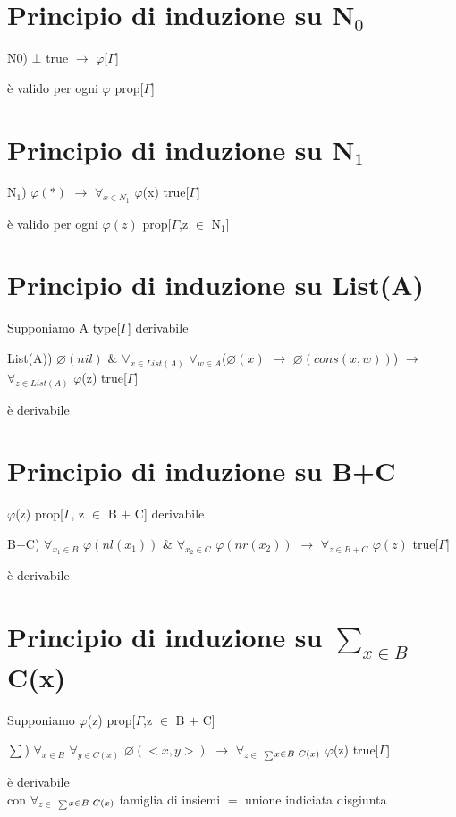 \section{Principio di induzione su N$_0$}
\label{sec:principio-di-induzione-N0}
\begin{center}N$0$) $\bot$ true $\rightarrow$ $\varphi$[$\Gamma$]\end{center} \`e valido per ogni $\varphi$ prop[$\Gamma$]
\section{Principio di induzione su N$_1$}
\label{sec:principio-di-induzione-N1}
\begin{center}N$_1$) $\varphi(\ast)$ $\rightarrow$ $\forall_{x \in N_1}$ $\varphi$(x) true[$\Gamma$] \end{center}\`e valido per ogni $\varphi(z)$ prop[$\Gamma$,z $\in$ N$_1$]

\section{Principio di induzione su List(A)}
\label{sec:principio-di-induzione-List(A)}
Supponiamo A type[$\Gamma$] derivabile \\
\begin{center}List(A)) $\varnothing(nil)$ $\&$ $\forall_{x \in List(A)}$ $\forall_{w \in A}$($\varnothing(x)$ $\rightarrow$ $\varnothing(cons(x,w))$) $\rightarrow$ $\forall_{z \in List(A)}$ $\varphi$(z) true[$\Gamma$]\end{center} \`e derivabile\\

\section{Principio di induzione su B+C}
\label{sec:principio-di-induzione-B+C}
$\varphi$(z) prop[$\Gamma$, z $\in$ B $+$ C] derivabile
\noindent
\begin{center}B$+$C) $\forall_{x_1 \in B}$  $\varphi(nl(x_1))$ $\&$ $\forall_{x_2 \in C}$  $\varphi(nr(x_2))$ $\rightarrow$ $\forall_{z\in B+C}$  $\varphi(z)$ true[$\Gamma$]\end{center} \`e derivabile
\section{Principio di induzione su $\sum\limits_{x \in B}$ C(x)}
\label{sec:principio-di-induzione-sum}
Supponiamo $\varphi$(z) prop[$\Gamma$,z $\in$ B $+$ C]
\begin{center}{\scriptsize $\sum$}) $\forall_{x \in B}$ $\forall_{y \in C(x)}$ $\varnothing(<x,y>)$ $\rightarrow$ $\forall_{z \in}$ {\scriptsize$_{\sum}$}$_{x \in B \hspace{0.1cm}C(x)}$ $\varphi$(z) true[$\Gamma$]\end{center} \`e derivabile\\
con $\forall_{z \in}$ {\scriptsize$_{\sum}$}$_{x \in B \hspace{0.1cm}C(x)}$ famiglia di insiemi $=$ unione indiciata disgiunta\\

